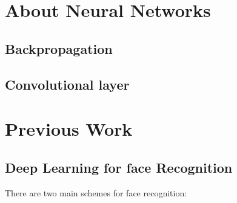 \section{About Neural Networks}
\subsection{Backpropagation}
\subsection{Convolutional layer}

\section{Previous Work}
\subsection{Deep Learning for face Recognition}
There are two main schemes for face recognition:
